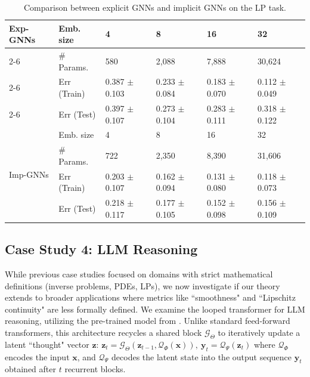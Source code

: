 \documentclass{amsart} %
\def\vx{{\bm{x}}}
\def\vy{{\bm{y}}}
\def\vz{{\bm{z}}}
\theoremstyle{definition}
\theoremstyle{remark}
\begin{document}
\begin{table}[t]
\centering
\caption{Comparison between explicit GNNs and implicit GNNs on the LP task.}
\label{tab:gnn-compare}
{\small
\begin{tabular}{l|l|l|l|l|l}
\hline
\multirow{4}{*}{Exp-GNNs} & Emb. size     & 4     & 8              & 16             & 32             \\ \cline{2-6} 
                               & \# Params.   & 580    & 2,088           & 7,888           & 30,624          \\ \cline{2-6} 
                               & Err (Train) & 0.387 $\pm$ 0.103 & 0.233 $\pm$ 0.084 & 0.183 $\pm$ 0.070 & 0.112 $\pm$ 0.049 \\ \cline{2-6} 
                               & Err (Test) & 0.397 $\pm$ 0.107  & 0.273 $\pm$ 0.104 & 0.283 $\pm$ 0.111 & 0.318 $\pm$ 0.122 \\ \hline\hline
\multirow{4}{*}{Imp-GNNs} & Emb. size     & 4     & 8              & 16             & 32             \\ \cline{2-6} 
                               & \# Params.   & 722    & 2,350           & 8,390           & 31,606          \\ \cline{2-6} 
                               & Err (Train) & 0.203 $\pm$ 0.107  & 0.162 $\pm$ 0.094 & 0.131 $\pm$ 0.080 & 0.118 $\pm$ 0.073 \\ \cline{2-6} 
                               & Err (Test) & 0.218 $\pm$ 0.117  & 0.177 $\pm$ 0.105 & 0.152 $\pm$ 0.098 & 0.156 $\pm$ 0.109 \\ \hline
\end{tabular}
}
\end{table}








\subsection{Case Study 4: LLM Reasoning}



While previous case studies focused on domains with strict mathematical definitions (inverse problems, PDEs, LPs), we now investigate if our theory extends to broader applications where metrics like ``smoothness" and ``Lipschitz continuity" are less formally defined. We examine the looped transformer for LLM reasoning, utilizing the pre-trained model from \cite{geiping2025scaling}. Unlike standard feed-forward transformers, this architecture recycles a shared block $\mathcal{G}_{\Theta}$ to iteratively update a latent ``thought" vector $\vz$: 
$
\vz_{t} = \mathcal{G}_{\Theta}(\vz_{t-1}, \mathcal{Q}_{\Phi}(\vx)), ~ \vy_{t} = \mathcal{Q}_{\Psi}(\vz_{t})
$
where $\mathcal{Q}_{\Phi}$ encodes the input $\vx$, and $\mathcal{Q}_{\Psi}$ decodes the latent state into the output sequence $\vy_t$ obtained after $t$ recurrent blocks.
\end{document}
